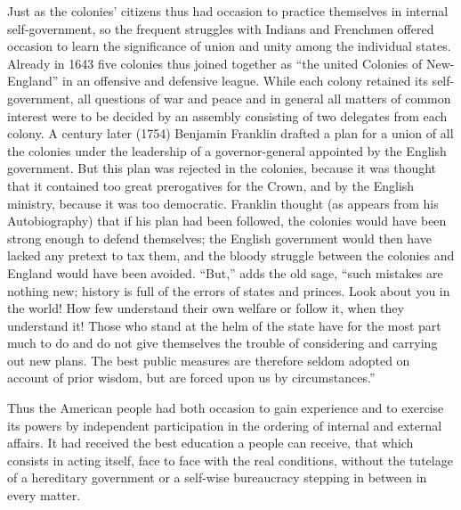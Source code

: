 \documentclass[12pt,a4paper,openany]{book}
\newcommand{\opage}[1]{\marginnote{\footnotesize\textit{[#1]}}}
\begin{document}
Just as the colonies' citizens thus had occasion
to practice themselves in internal self-government, so the frequent
struggles with Indians and Frenchmen offered occasion to learn
the significance of union and unity among the individual
states. Already in 1643 five colonies thus joined
together as ``the united Colonies of New-England'' in an
offensive and defensive league. While each colony
retained its self-government, all questions of war and
peace and in general all matters of common interest were to be decided by
an assembly consisting of two delegates from each colony.
A century later (1754) Benjamin Franklin drafted
a plan for a union of all the colonies under the leadership
of a governor-general appointed by the English government.
But this plan was rejected in the colonies, because it was thought
\opage{118}that it contained too great prerogatives for the Crown, and by
the English ministry, because it was too democratic.
Franklin thought (as appears from his Autobiography) that if
his plan had been followed, the colonies would have been
strong enough to defend themselves; the English government
would then have lacked any pretext to tax them, and
the bloody struggle between the colonies and England would have been
avoided. ``But,'' adds the old sage, ``such
mistakes are nothing new; history is full of the errors of states and princes.
Look about you in the world! How few understand
their own welfare or follow it, when they understand it! Those who
stand at the helm of the state have for the most part much to do
and do not give themselves the trouble of considering and carrying out new
plans. The best public measures are therefore
seldom adopted on account of prior wisdom, but are forced upon us
by circumstances.''

Thus the American people had both occasion
to gain experience and to exercise its powers by independent
participation in the ordering of internal and external affairs. It had
received the best education a people can receive, that which
consists in acting itself, face to face with the real
conditions, without the tutelage of a hereditary government or
a self-wise bureaucracy stepping in between in every matter.
\end{document}
